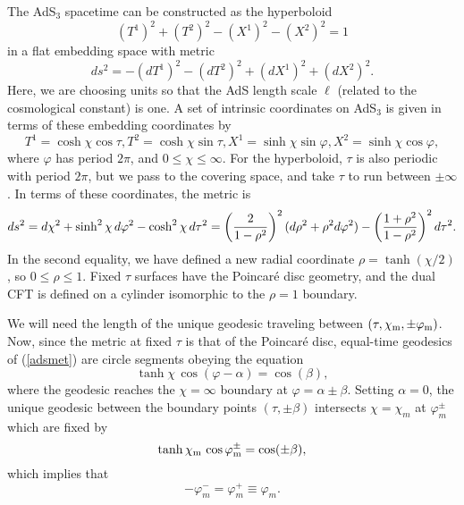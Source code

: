 \documentclass[a4paper,12pt]{article}
\begin{document}
The AdS$_3$ spacetime can be constructed as the hyperboloid 
\begin{equation}
(T^1)^2 + (T^2)^2 -(X^1)^2 - (X^2)^2  = 1
\end{equation}
in a flat embedding space with metric
\begin{equation}
ds^2 = -(dT^1)^2  -(dT^2)^2 +(dX^1)^2 +(dX^2)^2. 
\end{equation}
Here, we are choosing units so that the AdS length scale $\ell$
(related to the cosmological constant) is one. A set of intrinsic
coordinates on AdS$_3$ is given in terms of these embedding
coordinates by 
\begin{equation}
T^1 = \cosh \chi \cos \tau, T^2 = \cosh \chi \sin \tau, X^1 = \sinh
\chi \sin \varphi, X^2 = \sinh \chi \cos \varphi,
\end{equation}
where $\varphi$ has period $2\pi$, and $0 \leq \chi \leq \infty$. For
the hyperboloid, $\tau$ is also periodic with period $2\pi$, but we
pass to the covering space, and take $\tau$ to run between
$\pm\infty$. In terms of these coordinates, the metric is \begin{equation} 
ds^2 = d\chi^2 + \sinh^2\chi \, d\varphi^2 - \cosh^2\chi \, d\tau^2 =
\left({2 \over 1- \rho^2}\right)^2 (d\rho^2 + \rho^2 d\varphi^2) -
\left( {1 + \rho^2 \over 1 - \rho^2} \right)^2 d\tau^2.
\label{adsmet} 
\end{equation} 
% 
In the second equality, we have defined a new radial coordinate $\rho
= \tanh(\chi/2)$, so $0 \leq \rho \leq 1$. Fixed $\tau$ surfaces have
the Poincar\'e disc geometry, and the dual CFT is defined on a
cylinder isomorphic to the $\rho = 1$ boundary.

We will need the length of the unique geodesic traveling between
$(\tau,\chi_{{\rm m}},\pm\varphi_{{\rm m}})$. Now, since the metric at
fixed $\tau$ is that of the Poincar\'e disc, equal-time geodesics of
(\ref{adsmet}) are circle segments obeying the equation
% 
\begin{equation} 
\tanh\chi \, \cos(\varphi - \alpha) = \cos(\beta),
\label{geodeq} 
\end{equation} 
% 
where the geodesic reaches the $\chi = \infty$ boundary at $\varphi =
\alpha \pm \beta$. Setting $\alpha=0$, the unique geodesic between
the boundary points $(\tau,\pm \beta)$
intersects $\chi = \chi_m$ at $\varphi_m^\pm$ which are fixed by
% 
\begin{equation} 
\tanh\chi_{{\rm m}} \, \cos\varphi_{{\rm m}}^{\pm} = \cos(\pm\beta),
\label{phimax} 
\end{equation} 
% 
which implies that
% 
\begin{equation} 
-\varphi_m^- = \varphi_m^+ \equiv \varphi_m.
\end{equation} 
% 
\end{document}
